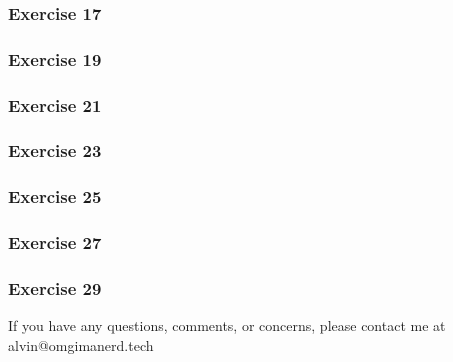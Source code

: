\documentclass{math}
\begin{document}
\subsubsection*{Exercise 17}
\subsubsection*{Exercise 19}
\subsubsection*{Exercise 21}
\subsubsection*{Exercise 23}
\subsubsection*{Exercise 25}
\subsubsection*{Exercise 27}
\subsubsection*{Exercise 29}

\begin{center}
  If you have any questions, comments, or concerns, please contact me at
  alvin@omgimanerd.tech
\end{center}
\end{document}
